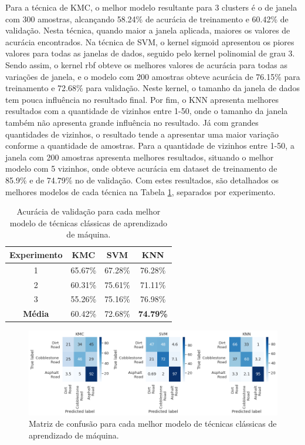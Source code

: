 Para a técnica de KMC, o melhor modelo resultante para 3 clusters é o de janela com 300 amostras, alcançando 58.24\% de acurácia de treinamento e 60.42\% de validação. Nesta técnica, quando maior a janela aplicada, maiores os valores de acurácia encontrados. Na técnica de SVM, o kernel sigmoid apresentou os piores valores para todas as janelas de dados, seguido pelo kernel polinomial de grau 3. Sendo assim, o kernel rbf obteve os melhores valores de acurácia para todas as variações de janela, e o modelo com 200 amostras obteve acurácia de 76.15\% para treinamento e 72.68\% para validação. Neste kernel, o tamanho da janela de dados tem pouca influência no resultado final. Por fim, o KNN apresenta melhores resultados com a quantidade de vizinhos entre 1-50, onde o tamanho da janela também não apresenta grande influência no resultado. Já com grandes quantidades de vizinhos, o resultado tende a apresentar uma maior variação conforme a quantidade de amostras. Para a quantidade de vizinhos entre 1-50, a janela com 200 amostras apresenta melhores resultados, situando o melhor modelo com 5 vizinhos, onde obteve acurácia em dataset de treinamento de 85.9\% e de 74.79\% no de validação. Com estes resultados, são detalhados os melhores modelos de cada técnica na Tabela \ref{table:classical_ml_results}, separados por experimento.

\begin{table}[h!]
\caption{Acurácia de validação para cada melhor modelo de técnicas clássicas de aprendizado de máquina.} 
\label{table:classical_ml_results}
\centering
\small
\begin{tabular}{cccc}
\toprule
\textbf{Experimento} & 
\textbf{KMC} & 
\textbf{SVM} & 
\textbf{KNN} \\ \midrule
1 & 65.67\% & 67.28\% & 76.28\% \\ \midrule
2 & 60.31\% & 75.61\% & 71.11\% \\ \midrule
3 & 55.26\% & 75.16\% & 76.98\% \\ \midrule
\textbf{Média} & 60.42\% & 72.68\% & \textbf{74.79\%} \\ \bottomrule
\end{tabular}
\end{table}

\begin{figure}[h!]
  \centering
  \includegraphics[width=1\textwidth]{figuras/confusion_matrix_classical.png}
  \caption{Matriz de confusão para cada melhor modelo de técnicas clássicas de aprendizado de máquina.}
  \label{fig:confusion_matrix_classical}
\end{figure}

